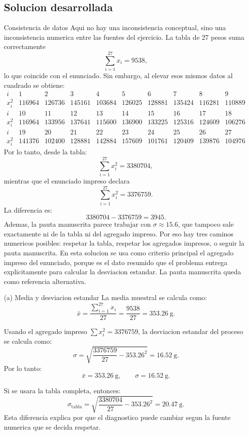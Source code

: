 \subsection{Solucion desarrollada}

\begin{trampa}{Consistencia de datos}
Aqui no hay una inconsistencia conceptual, sino una inconsistencia numerica entre las fuentes del ejercicio. La tabla de 27 pesos suma correctamente
\[
\sum_{i=1}^{27}x_i=9538,
\]
lo que coincide con el enunciado. Sin embargo, al elevar esos mismos datos al cuadrado se obtiene:
\[
\begin{array}{c|rrrrrrrrr}
i & 1&2&3&4&5&6&7&8&9\\
\hline
x_i^2 & 116964&126736&145161&103684&126025&128881&135424&116281&110889
\end{array}
\]
\[
\begin{array}{c|rrrrrrrrr}
i & 10&11&12&13&14&15&16&17&18\\
\hline
x_i^2 & 116964&133956&137641&115600&136900&133225&125316&124609&106276
\end{array}
\]
\[
\begin{array}{c|rrrrrrrrr}
i & 19&20&21&22&23&24&25&26&27\\
\hline
x_i^2 & 141376&102400&128881&142884&157609&101761&120409&139876&104976
\end{array}
\]
Por lo tanto, desde la tabla:
\[
\sum_{i=1}^{27}x_i^2=3380704,
\]
mientras que el enunciado impreso declara
\[
\sum_{i=1}^{27}x_i^2=3376759.
\]
La diferencia es:
\[
3380704-3376759=3945.
\]
Ademas, la pauta manuscrita parece trabajar con \(\sigma\approx 15.6\), que tampoco sale exactamente ni de la tabla ni del agregado impreso. Por eso hay tres caminos numericos posibles: respetar la tabla, respetar los agregados impresos, o seguir la pauta manuscrita. En esta solucion se usa como criterio principal el agregado impreso del enunciado, porque es el dato resumido que el problema entrega explicitamente para calcular la desviacion estandar. La pauta manuscrita queda como referencia alternativa.
\end{trampa}

\begin{respuesta}{(a) Media y desviacion estandar}
La media muestral se calcula como:
\[
\bar x=\frac{\sum_{i=1}^{27}x_i}{27}
=\frac{9538}{27}=353.26\ \text{g}.
\]

Usando el agregado impreso \(\sum x_i^2=3376759\), la desviacion estandar del proceso se calcula como:
\[
\sigma
=\sqrt{\frac{3376759}{27}-353.26^2}
=16.52\ \text{g}.
\]
Por lo tanto:
\[
\boxed{\bar x=353.26\ \text{g}},\qquad
\boxed{\sigma=16.52\ \text{g}}.
\]

Si se usara la tabla completa, entonces:
\[
\sigma_{\text{tabla}}
=\sqrt{\frac{3380704}{27}-353.26^2}
=20.47\ \text{g}.
\]
Esta diferencia explica por que el diagnostico puede cambiar segun la fuente numerica que se decida respetar.
\end{respuesta}

